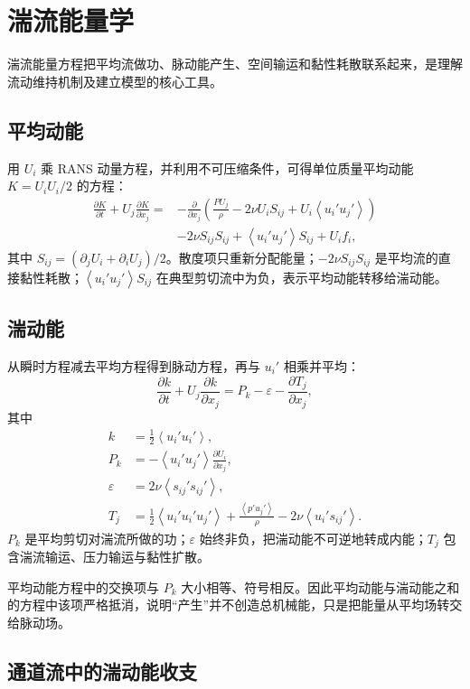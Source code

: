 \documentclass[12pt,a4paper,openany,fontset=none]{ctexbook}
\newcommand{\avg}[1]{\left\langle #1\right\rangle}
\begin{document}
\chapter{湍流能量学}

湍流能量方程把平均流做功、脉动能产生、空间输运和黏性耗散联系起来，是理解流动维持机制及建立模型的核心工具。

\section{平均动能}

用 $U_i$ 乘 RANS 动量方程，并利用不可压缩条件，可得单位质量平均动能 $K=U_iU_i/2$ 的方程：
\begin{align}
 \frac{\partial K}{\partial t}+U_j\frac{\partial K}{\partial x_j}
 =&-\frac{\partial}{\partial x_j}\left(\frac{PU_j}{\rho}
 -2\nu U_iS_{ij}+U_i\avg{u_i'u_j'}\right)\nonumber\\
 &-2\nu S_{ij}S_{ij}+\avg{u_i'u_j'}S_{ij}+U_if_i,
\end{align}
其中 $S_{ij}=(\partial_jU_i+\partial_iU_j)/2$。散度项只重新分配能量；$-2\nu S_{ij}S_{ij}$ 是平均流的直接黏性耗散；$\avg{u_i'u_j'}S_{ij}$ 在典型剪切流中为负，表示平均动能转移给湍动能。

\section{湍动能}

从瞬时方程减去平均方程得到脉动方程，再与 $u_i'$ 相乘并平均：
\begin{equation}
 \frac{\partial k}{\partial t}+U_j\frac{\partial k}{\partial x_j}
 =P_k-\varepsilon-\frac{\partial T_j}{\partial x_j},
\end{equation}
其中
\begin{align}
 k&=\frac12\avg{u_i'u_i'},\\
 P_k&=-\avg{u_i'u_j'}\frac{\partial U_i}{\partial x_j},\\
 \varepsilon&=2\nu\avg{s_{ij}'s_{ij}'},\\
 T_j&=\frac12\avg{u_i'u_i'u_j'}+\frac{\avg{p'u_j'}}{\rho}-2\nu\avg{u_i's_{ij}'}.
\end{align}
$P_k$ 是平均剪切对湍流所做的功；$\varepsilon$ 始终非负，把湍动能不可逆地转成内能；$T_j$ 包含湍流输运、压力输运与黏性扩散。

平均动能方程中的交换项与 $P_k$ 大小相等、符号相反。因此平均动能与湍动能之和的方程中该项严格抵消，说明“产生”并不创造总机械能，只是把能量从平均场转交给脉动场。

\section{通道流中的湍动能收支}
\end{document}
